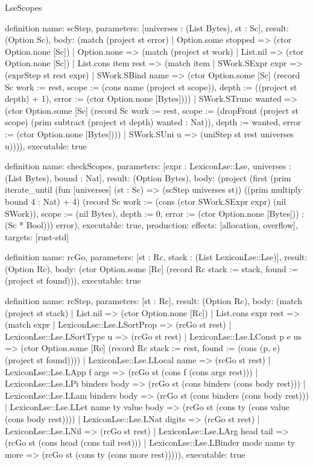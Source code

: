 \begin{lexlean}{LseScopes}
\begin{semanticmodule}
definition{
  name: scStep,
  parameters: [universes : (List Bytes), st : Sc],
  result: (Option Sc),
  body: (match (project st error)
    | Option.some stopped => (ctor Option.none [Sc])
    | Option.none => (match (project st work)
      | List.nil => (ctor Option.none [Sc])
      | List.cons item rest => (match item
        | SWork.SExpr expr => (exprStep st rest expr)
        | SWork.SBind name => (ctor Option.some [Sc] (record Sc {work := rest, scope := (cons name (project st scope)), depth := ((project st depth) + 1), error := (ctor Option.none [Bytes])}))
        | SWork.STrunc wanted => (ctor Option.some [Sc] (record Sc {work := rest, scope := (dropFront (project st scope) (prim subtract (project st depth) wanted : Nat)), depth := wanted, error := (ctor Option.none [Bytes])}))
        | SWork.SUni u => (uniStep st rest universes u)))),
  executable: true
}

definition{
  name: checkScopes,
  parameters: [expr : LexiconLse::Lse, universes : (List Bytes), bound : Nat],
  result: (Option Bytes),
  body: (project (first (prim iterate_until (fun [universes] (st : Sc) => (scStep universes st)) ((prim multiply bound 4 : Nat) + 4) (record Sc {work := (cons (ctor SWork.SExpr expr) (nil SWork)), scope := (nil Bytes), depth := 0, error := (ctor Option.none [Bytes])}) : (Sc * Bool))) error),
  executable: true,
  production: {effects: [allocation, overflow], targets: [rust-std]}
}

definition{
  name: rcGo,
  parameters: [st : Rc, stack : (List LexiconLse::Lse)],
  result: (Option Rc),
  body: (ctor Option.some [Rc] (record Rc {stack := stack, found := (project st found)})),
  executable: true
}

definition{
  name: rcStep,
  parameters: [st : Rc],
  result: (Option Rc),
  body: (match (project st stack)
    | List.nil => (ctor Option.none [Rc])
    | List.cons expr rest => (match expr
      | LexiconLse::Lse.LSortProp => (rcGo st rest)
      | LexiconLse::Lse.LSortType u => (rcGo st rest)
      | LexiconLse::Lse.LConst p e us => (ctor Option.some [Rc] (record Rc {stack := rest, found := (cons (p, e) (project st found))}))
      | LexiconLse::Lse.LLocal name => (rcGo st rest)
      | LexiconLse::Lse.LApp f args => (rcGo st (cons f (cons args rest)))
      | LexiconLse::Lse.LPi binders body => (rcGo st (cons binders (cons body rest)))
      | LexiconLse::Lse.LLam binders body => (rcGo st (cons binders (cons body rest)))
      | LexiconLse::Lse.LLet name ty value body => (rcGo st (cons ty (cons value (cons body rest))))
      | LexiconLse::Lse.LNat digits => (rcGo st rest)
      | LexiconLse::Lse.LNil => (rcGo st rest)
      | LexiconLse::Lse.LArg head tail => (rcGo st (cons head (cons tail rest)))
      | LexiconLse::Lse.LBinder mode name ty more => (rcGo st (cons ty (cons more rest))))),
  executable: true
}


\end{semanticmodule}
\end{lexlean}
